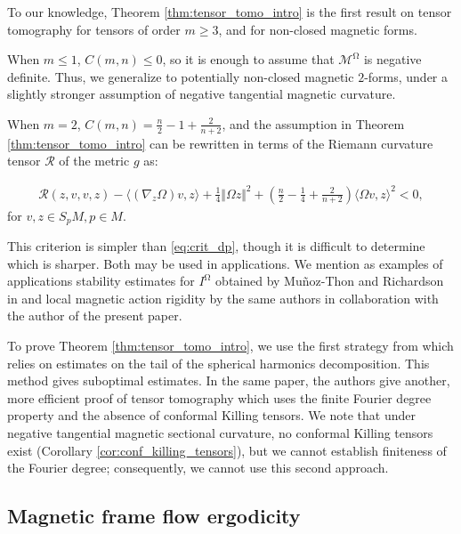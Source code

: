 \documentclass[12pt]{amsart}
\numberwithin{numbering}{section}
\theoremstyle{plain}
\theoremstyle{definition}
\theoremstyle{remark}
\numberwithin{equation}{section}
\DeclareMathOperator{\mg}{\Omega}
\begin{document}
To our knowledge, Theorem \ref{thm:tensor_tomo_intro} is the first result on tensor tomography for tensors of order $m \geq 3$, and for non-closed magnetic forms.

\medskip

When $m \leq 1$, $C(m, n) \leq 0$, so it is enough to assume that $\mathcal{M}^{\mg}$ is negative definite. Thus, we generalize \cite[Theorem B]{dairbekov2008optical} to potentially non-closed magnetic $2$-forms, under a slightly stronger assumption of negative tangential magnetic curvature.

\smallskip

When $m = 2$, $C(m, n) = \frac{n}{2} - 1 + \frac{2}{n+2}$, and the assumption in Theorem \ref{thm:tensor_tomo_intro} can be rewritten in terms of the Riemann curvature tensor $\mathcal{R}$ of the metric $g$ as:

\begin{align*}
\mathcal{R}(z, v, v, z) - \langle (\nabla_z \Omega) v, z \rangle + \frac{1}{4} \Vert \Omega z \Vert^2 + \left ( \frac{n}{2} - \frac{1}{4} + \frac{2}{n+2} \right ) \langle \Omega v, z \rangle^2 < 0,
\end{align*}
for $v, z \in S_p M, p \in M$.

This criterion is simpler than \eqref{eq:crit_dp}, though it is difficult to determine which is sharper. Both may be used in applications. We mention as examples of applications stability estimates for $I^{\mg}$ obtained by Mu\~{n}oz-Thon and Richardson in \cite{munoz2025guillarmou} and local magnetic action rigidity \cite{beaufort2026rigidity} by the same authors in collaboration with the author of the present paper.

\smallskip

To prove Theorem \ref{thm:tensor_tomo_intro}, we use the first strategy from \cite{guillarmou2016xray} which relies on estimates on the tail of the spherical harmonics decomposition. This method gives suboptimal estimates. In the same paper, the authors give another, more efficient proof of tensor tomography which uses the finite Fourier degree property and the absence of conformal Killing tensors. We note that under negative tangential magnetic sectional curvature, no conformal Killing tensors exist (Corollary \ref{cor:conf_killing_tensors}), but we cannot establish finiteness of the Fourier degree; consequently, we cannot use this second approach.

\subsection{Magnetic frame flow ergodicity}
\end{document}

